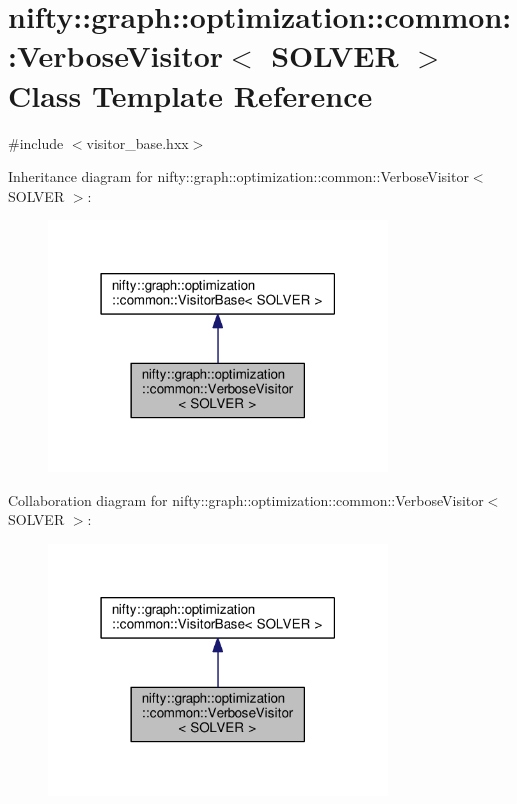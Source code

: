 \hypertarget{classnifty_1_1graph_1_1optimization_1_1common_1_1VerboseVisitor}{}\section{nifty\+:\+:graph\+:\+:optimization\+:\+:common\+:\+:Verbose\+Visitor$<$ S\+O\+L\+V\+E\+R $>$ Class Template Reference}
\label{classnifty_1_1graph_1_1optimization_1_1common_1_1VerboseVisitor}


{\ttfamily \#include $<$visitor\+\_\+base.\+hxx$>$}



Inheritance diagram for nifty\+:\+:graph\+:\+:optimization\+:\+:common\+:\+:Verbose\+Visitor$<$ S\+O\+L\+V\+E\+R $>$\+:\nopagebreak
\begin{figure}[H]
\begin{center}
\leavevmode
\includegraphics[width=255pt]{classnifty_1_1graph_1_1optimization_1_1common_1_1VerboseVisitor__inherit__graph}
\end{center}
\end{figure}


Collaboration diagram for nifty\+:\+:graph\+:\+:optimization\+:\+:common\+:\+:Verbose\+Visitor$<$ S\+O\+L\+V\+E\+R $>$\+:\nopagebreak
\begin{figure}[H]
\begin{center}
\leavevmode
\includegraphics[width=255pt]{classnifty_1_1graph_1_1optimization_1_1common_1_1VerboseVisitor__coll__graph}
\end{center}
\end{figure}
